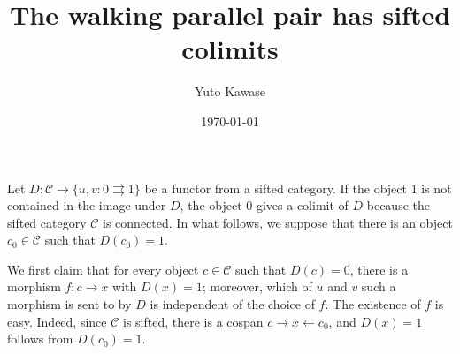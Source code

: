 \documentclass[a4paper,12pt,reqno]{amsart}
\title{The walking parallel pair has sifted colimits}
\author{Yuto Kawase}
\date{\today}
\begin{document}
\maketitle

Let $D\colon\mathcal{C}\to \{u,v\colon 0 \rightrightarrows 1\}$ be a functor from a sifted category.
If the object $1$ is not contained in the image under $D$, the object $0$ gives a colimit of $D$ because the sifted category $\mathcal{C}$ is connected.
In what follows, we suppose that there is an object $c_0\in\mathcal{C}$ such that $D(c_0)=1$.

We first claim that for every object $c\in\mathcal{C}$ such that $D(c)=0$, there is a morphism $f\colon c \to x$ with $D(x)=1$; moreover, which of $u$ and $v$ such a morphism is sent to by $D$ is independent of the choice of $f$.
The existence of $f$ is easy.
Indeed, since $\mathcal{C}$ is sifted, there is a cospan $c \rightarrow x \leftarrow c_0$, and $D(x)=1$ follows from $D(c_0)=1$.
\end{document}
